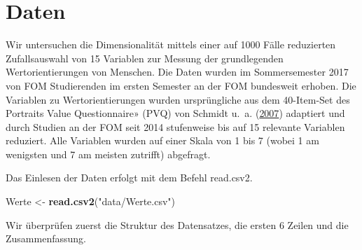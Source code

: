 \documentclass[12pt,ngerman,]{book}
\makeatletter
\newenvironment{Shaded}{\begin{snugshade}}{\end{snugshade}}
\newcommand{\KeywordTok}[1]{\textcolor[rgb]{0.13,0.29,0.53}{\textbf{{#1}}}}
\newcommand{\StringTok}[1]{\textcolor[rgb]{0.31,0.60,0.02}{{#1}}}
\newcommand{\NormalTok}[1]{{#1}}
\newenvironment{kframe}{%
\medskip{}
\setlength{\fboxsep}{.8em}
 \def\at@end@of@kframe{}%
 \ifinner\ifhmode%
  \def\at@end@of@kframe{\end{minipage}}%
  \begin{minipage}{\columnwidth}%
 \fi\fi%
 \def\FrameCommand##1{\hskip\@totalleftmargin \hskip-\fboxsep
 \colorbox{shadecolor}{##1}\hskip-\fboxsep
     \hskip-\linewidth \hskip-\@totalleftmargin \hskip\columnwidth}%
 \MakeFramed {\advance\hsize-\width
   \@totalleftmargin\z@ \linewidth\hsize
   \@setminipage}}%
 {\par\unskip\endMakeFramed%
 \at@end@of@kframe}
\renewenvironment{Shaded}{\begin{kframe}}{\end{kframe}}
\makeatother
\begin{document}
\section{Daten}\label{daten-1}

Wir untersuchen die Dimensionalität mittels einer auf 1000 Fälle
reduzierten Zufallsauswahl von 15 Variablen zur Messung der
grundlegenden Wertorientierungen von Menschen. Die Daten wurden im
Sommersemester 2017 von FOM Studierenden im ersten Semester an der FOM
bundesweit erhoben. Die Variablen zu Wertorientierungen wurden
ursprüngliche aus dem 40-Item-Set des Portraits Value Questionnaire»
(PVQ) von Schmidt u.~a. (\protect\hyperlink{ref-Schmidt2007}{2007})
adaptiert und durch Studien an der FOM seit 2014 stufenweise bis auf 15
relevante Variablen reduziert. Alle Variablen wurden auf einer Skala von
1 bis 7 (wobei 1 am wenigsten und 7 am meisten zutrifft) abgefragt.

Das Einlesen der Daten erfolgt mit dem Befehl read.csv2.

\begin{Shaded}
\begin{Highlighting}[]
\NormalTok{Werte <-}\StringTok{ }\KeywordTok{read.csv2}\NormalTok{(}\StringTok{"data/Werte.csv"}\NormalTok{)}
\end{Highlighting}
\end{Shaded}

Wir überprüfen zuerst die Struktur des Datensatzes, die ersten 6 Zeilen
und die Zusammenfassung.
\end{document}
